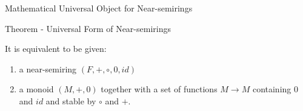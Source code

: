 \documentclass[11pt]{beamer}
\begin{document}
\begin{frame}{Mathematical Universal Object for Near-semirings}

\begin{block}{Theorem - Universal Form of Near-semirings}

	It is equivalent to be given:
	
	\begin{enumerate}
	
		\item a near-semiring $(F,+,\circ,0,id)$
		
		\item a monoid $(M,+,0)$ together with a set of functions $M \to M$ containing $0$ and $id$ and stable by $\circ$ and $+$.
	
	\end{enumerate}

\end{block}

\end{frame}
\end{document}

